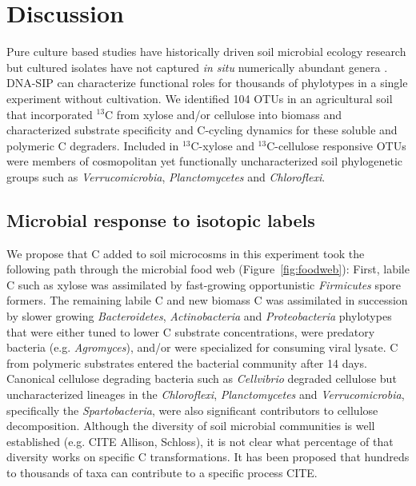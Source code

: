 \section{Discussion} 
Pure culture based studies have historically driven soil microbial ecology
research but cultured isolates have not captured \textit{in situ} numerically
abundant genera \citep{Janssen2006}. DNA-SIP can
characterize functional roles for thousands of phylotypes in a single
experiment without cultivation. We identified 104 OTUs in an agricultural soil
that incorporated $^{13}$C from xylose and/or cellulose into biomass and
characterized substrate specificity and C-cycling dynamics for these soluble
and polymeric C degraders. Included in $^{13}$C-xylose and
$^{13}$C-cellulose responsive OTUs were members of cosmopolitan yet
functionally uncharacterized soil phylogenetic groups such as
\textit{Verrucomicrobia}, \textit{Planctomycetes} and \textit{Chloroflexi}.

\subsection{Microbial response to isotopic labels}
We propose that C added to soil microcosms in this experiment took the
following path through the microbial food web (Figure~\ref{fig:foodweb}):
First, labile C such as xylose was assimilated by fast-growing opportunistic
\textit{Firmicutes} spore formers. The remaining labile C and new biomass C was
assimilated in succession by slower growing \textit{Bacteroidetes},
\textit{Actinobacteria} and \textit{Proteobacteria} phylotypes that were either
tuned to lower C substrate concentrations, were predatory bacteria (e.g.
\textit{Agromyces}), and/or were specialized for consuming viral lysate. C from
polymeric substrates entered the bacterial community after 14 days. Canonical
cellulose degrading bacteria such as \textit{Cellvibrio} degraded cellulose
but uncharacterized lineages in the \textit{Chloroflexi},
\textit{Planctomycetes} and \textit{Verrucomicrobia}, specifically the
\textit{Spartobacteria}, were also significant contributors to cellulose
decomposition. Although the diversity of soil microbial communities is well
established (e.g. CITE Allison, Schloss), it is not clear what percentage of
that diversity works on specific C transformations. It has been proposed that
hundreds to thousands of taxa can contribute to a specific process CITE. 

